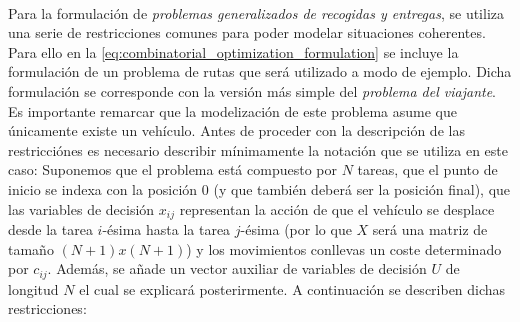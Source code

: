\documentclass{subfiles}
\begin{document}
        \paragraph{}
        Para la formulación de \emph{problemas generalizados de recogidas y entregas}, se utiliza una serie de restricciones comunes para poder modelar situaciones coherentes. Para ello en la \cref{eq:combinatorial_optimization_formulation} se incluye la formulación de un problema de rutas que será utilizado a modo de ejemplo. Dicha formulación se corresponde con la versión más simple del \emph{problema del viajante}. Es importante remarcar que la modelización de este problema asume que únicamente existe un vehículo. Antes de proceder con la descripción de las restricciónes es necesario describir mínimamente la notación que se utiliza en este caso: Suponemos que el problema está compuesto por $N$ tareas, que el punto de inicio se indexa con la posición $0$ (y que también deberá ser la posición final), que las variables de decisión $x_{ij}$ representan la acción de que el vehículo se desplace desde la tarea $i$-ésima hasta la tarea $j$-ésima (por lo que $X$ será una matriz de tamaño $(N + 1) x (N + 1)$) y los movimientos conllevas un coste determinado por $c_{ij}$. Además, se añade un vector auxiliar de variables de decisión $U$ de longitud $N$ el cual se explicará posterirmente. A continuación se describen dichas restricciones:
\end{document}
